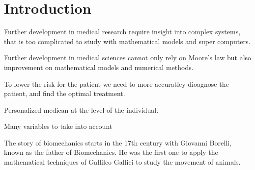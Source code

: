 \chapter{Introduction}

Further development in medical research require insight into complex
systems, that is too complicated to study with mathematical models and
super computers.

Further development in medical sciences cannot only rely on Moore's
law but also improvement on mathematical models and numerical
methods. 

To lower the risk for the patient we need to more accuratley dioagnose
the patient, and find the optimal treatment.

Personalized medican at the level of the individual. 

Many variables to take into account

The story of biomechanics starts in the 17th century with Giovanni
Borelli, known as the father of Biomechanics. He was the first one to
apply the mathematical techniques of Gallileo Galliei to study the
movement of animals. 




% 




\pagebreak






